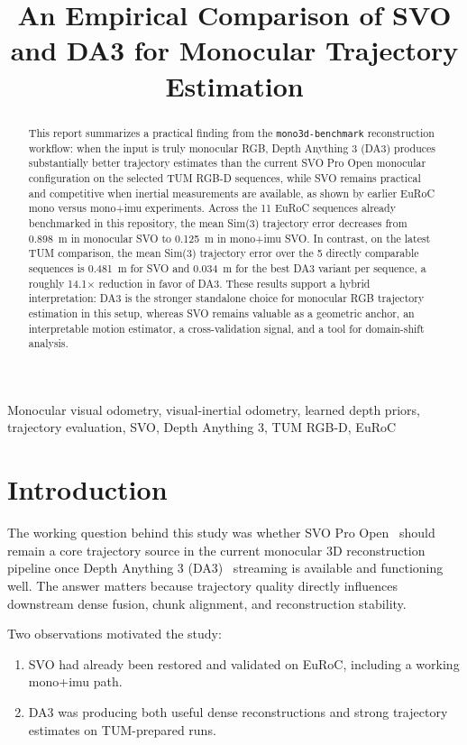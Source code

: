 \documentclass[conference]{IEEEtran}
\title{An Empirical Comparison of SVO and DA3 for Monocular Trajectory Estimation}
\author{
\IEEEauthorblockN{Project Report Draft}
\IEEEauthorblockA{mono3d-benchmark Experimental Notes\\
June 10, 2026}
}
\begin{document}
\maketitle

\begin{abstract}
This report summarizes a practical finding from the \texttt{mono3d-benchmark} reconstruction workflow: when the input is truly monocular RGB, Depth Anything 3 (DA3) produces substantially better trajectory estimates than the current SVO Pro Open monocular configuration on the selected TUM RGB-D sequences, while SVO remains practical and competitive when inertial measurements are available, as shown by earlier EuRoC mono versus mono+imu experiments. Across the 11 EuRoC sequences already benchmarked in this repository, the mean Sim(3) trajectory error decreases from 0.898~m in monocular SVO to 0.125~m in mono+imu SVO. In contrast, on the latest TUM comparison, the mean Sim(3) trajectory error over the 5 directly comparable sequences is 0.481~m for SVO and 0.034~m for the best DA3 variant per sequence, a roughly 14.1$\times$ reduction in favor of DA3. These results support a hybrid interpretation: DA3 is the stronger standalone choice for monocular RGB trajectory estimation in this setup, whereas SVO remains valuable as a geometric anchor, an interpretable motion estimator, a cross-validation signal, and a tool for domain-shift analysis.
\end{abstract}

\begin{IEEEkeywords}
Monocular visual odometry, visual-inertial odometry, learned depth priors, trajectory evaluation, SVO, Depth Anything 3, TUM RGB-D, EuRoC
\end{IEEEkeywords}

\section{Introduction}
The working question behind this study was whether SVO Pro Open~\cite{forster2017svo} should remain a core trajectory source in the current monocular 3D reconstruction pipeline once Depth Anything 3 (DA3)~\cite{yang2024depthanything} streaming is available and functioning well. The answer matters because trajectory quality directly influences downstream dense fusion, chunk alignment, and reconstruction stability.

Two observations motivated the study:
\begin{enumerate}
\item SVO had already been restored and validated on EuRoC, including a working mono+imu path.
\item DA3 was producing both useful dense reconstructions and strong trajectory estimates on TUM-prepared runs.
\end{enumerate}
\end{document}
